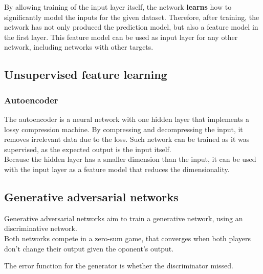 \documentclass[11pt]{article}
\begin{document}
By allowing training of the input layer itself, the network \textbf{learns} how to
significantly model the inputs for the given dataset. Therefore, after training, the
network has not only produced the prediction model, but also a feature model in the
first layer. This feature model can be used as input layer for any other network,
including networks with other targets.
\subsection{Unsupervised feature learning}
\label{sec:org7e4f9c2}
\subsubsection{Autoencoder}
\label{sec:orgaac1689}
The autoencoder is a neural network with one hidden layer that implements a lossy
compression machine. By compressing and decompressing the input, it removes irrelevant
data due to the loss. Such network can be trained as it was supervised, as the
expected output is the input itself. \\

Because the hidden layer has a smaller dimension than the input, it can be used with
the input layer as a feature model that reduces the dimensionality.
\subsection{Generative adversarial networks}
\label{sec:org7e90ab1}
Generative adversarial networks aim to train a generative network, using an
discriminative network. \\
Both networks compete in a zero-sum game, that converges when both players don't
change their output given the oponent's output.
\begin{center}

\end{center}
The error function for the generator is whether the discriminator missed.
\end{document}
